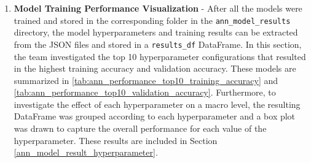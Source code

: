\documentclass[a4paper]{article}
\begin{document}
\begin{enumerate}
    \item \textbf{Model Training Performance Visualization} - After all the models were trained and stored in the corresponding folder in the \lstinline{ann_model_results} directory, the model hyperparameters and training results can be extracted from the JSON files and stored in a \lstinline{results_df} DataFrame. In this section, the team investigated the top 10 hyperparameter configurations that resulted in the highest training accuracy and validation accuracy. These models are summarized in \autoref{tab:ann_performance_top10_training_accuracy} and \autoref{tab:ann_performance_top10_validation_accuracy}. Furthermore, to investigate the effect of each hyperparameter on a macro level, the resulting DataFrame was grouped according to each hyperparameter and a box plot was drawn to capture the overall performance for each value of the hyperparameter. These results are included in Section \ref{ann_model_result_hyperparameter}.
\end{enumerate}
\end{document}
